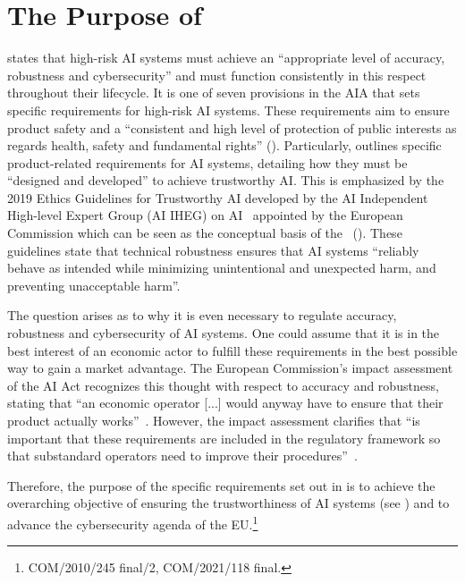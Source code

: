 \section{The Purpose of }\label{sec:purpose_15aia}
%
 states that high-risk AI systems must achieve an ``appropriate level of accuracy, robustness and cybersecurity'' and must function consistently in this respect throughout their lifecycle. It is one of seven provisions in the AIA that sets specific requirements for high-risk AI systems. 
%
These requirements aim to ensure product safety and 
% 
a ``consistent and high level of protection of public interests as regards health, safety and fundamental rights'' (). Particularly,  outlines specific product-related requirements for AI systems, detailing how they must be ``designed and developed'' to achieve trustworthy AI. 
%
This is emphasized by the 2019 Ethics Guidelines for Trustworthy AI developed by
the AI Independent High-level Expert Group (AI IHEG) on AI~\citep{aiiheg2019guidelines} appointed by the European Commission which can be seen as the conceptual basis of the \EUAIAct\ (). 
%
These guidelines state that technical robustness ensures that AI systems ``reliably behave as intended while minimizing unintentional and unexpected harm, and preventing unacceptable harm''.

The question arises as to why it is even necessary to regulate accuracy, robustness and cybersecurity of AI systems. 
%
One could assume that it is in the best interest of an economic actor to fulfill these requirements in the best possible way to gain a market advantage. 
%
The European Commission's impact assessment of the AI Act recognizes this thought with respect to accuracy and robustness, stating that ``an economic operator [...] would anyway have
to ensure that their product actually works''~\citep[Annex 4]{assessment2021commission}.
%
However, the impact assessment clarifies that ``is important that these requirements are included in the regulatory framework so that
substandard operators need to improve their procedures''~\citep[Annex 4]{assessment2021commission}.


Therefore, the purpose of the specific requirements set out in  is to achieve the overarching objective of ensuring the trustworthiness of AI systems (see ) and to advance the cybersecurity agenda of the EU.\footnote{COM/2010/245 final/2, COM/2021/118 final.}
% 